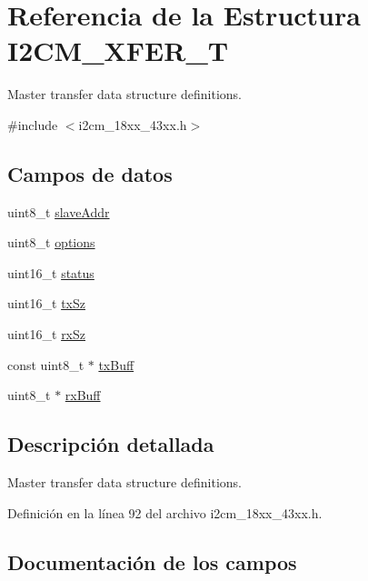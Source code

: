 \hypertarget{struct_i2_c_m___x_f_e_r___t}{}\section{Referencia de la Estructura I2\+C\+M\+\_\+\+X\+F\+E\+R\+\_\+T}
\label{struct_i2_c_m___x_f_e_r___t}


Master transfer data structure definitions.  




{\ttfamily \#include $<$i2cm\+\_\+18xx\+\_\+43xx.\+h$>$}

\subsection*{Campos de datos}
\begin{DoxyCompactItemize}
\item 
uint8\+\_\+t \hyperlink{struct_i2_c_m___x_f_e_r___t_a771bfcb0b066269afae6905ce5804c89}{slave\+Addr}
\item 
uint8\+\_\+t \hyperlink{struct_i2_c_m___x_f_e_r___t_aace3d640c8d449b8db1162993d259d3f}{options}
\item 
uint16\+\_\+t \hyperlink{struct_i2_c_m___x_f_e_r___t_a5393c99e246925076b1dfd69a64177ef}{status}
\item 
uint16\+\_\+t \hyperlink{struct_i2_c_m___x_f_e_r___t_ae528037278b667566b4c8caac3167b91}{tx\+Sz}
\item 
uint16\+\_\+t \hyperlink{struct_i2_c_m___x_f_e_r___t_a05f4dc274b335e29f87dbc8575a170b9}{rx\+Sz}
\item 
const uint8\+\_\+t $\ast$ \hyperlink{struct_i2_c_m___x_f_e_r___t_aa273a5a6ef5e2426562692030769f5d8}{tx\+Buff}
\item 
uint8\+\_\+t $\ast$ \hyperlink{struct_i2_c_m___x_f_e_r___t_a0aa410ff8cbc01a00b2fa2189e1c2938}{rx\+Buff}
\end{DoxyCompactItemize}


\subsection{Descripción detallada}
Master transfer data structure definitions. 

Definición en la línea 92 del archivo i2cm\+\_\+18xx\+\_\+43xx.\+h.



\subsection{Documentación de los campos}
